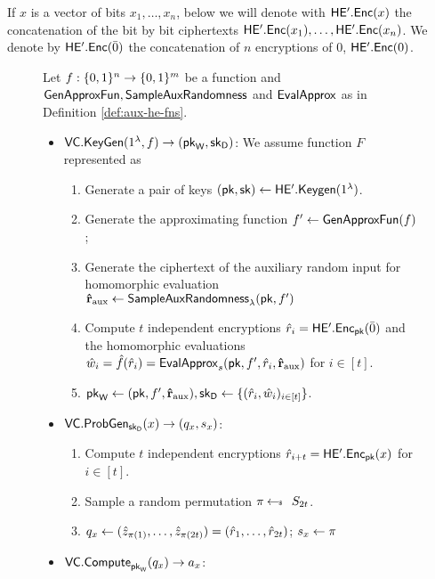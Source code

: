 If $x$ is a vector of bits $x_1, \dots, x_n$, below we will denote with $\mathsf{HE'.Enc}(x)$ the concatenation of the bit by bit ciphertexts $\mathsf{HE'.Enc}(x_1), \dots, \mathsf{HE'.Enc}(x_n)$. We denote by $\mathsf{HE'.Enc}(\bar{0})$ the concatenation of $n$ encryptions of $0$, $\mathsf{HE'.Enc}(0)$.


\begin{figure}
\begin{framed}
Let $f: \{0, 1\}^n \to \{0, 1\}^m$ be a function and $\mathsf{GenApproxFun}, \mathsf{SampleAuxRandomness}$ and $\mathsf{EvalApprox}$ as in Definition \ref{def:aux-he-fns}.
\begin{itemize}
\item $\mathsf{VC.KeyGen}(1^\lambda, f) \rightarrow (\mathsf{pk}_{\mathsf{W}}, \mathsf{sk}_{\mathsf{D}})$: We assume function $F$ represented as 
\begin{enumerate}
\item Generate a pair of keys $(\mathsf{pk},\mathsf{sk}) \gets \mathsf{HE'.Keygen}(1^\lambda)$.
\item Generate the approximating function $f' \gets \mathsf{GenApproxFun}(f)$;
\item Generate the ciphertext of the auxiliary random input for homomorphic evaluation $\mathbf{\hat{r}}_{\text{aux}} \gets \mathsf{SampleAuxRandomness}_{\lambda}(\mathsf{pk}, f')$
\item Compute $t$ independent encryptions $\hat{r}_i = \mathsf{HE'.Enc}_{\mathsf{pk}}(\bar{0})$ and the homomorphic evaluations $\hat{w}_i = \hat{f}(\hat{r}_i) =  \mathsf{EvalApprox}_s(\mathsf{pk}, f', \hat{r}_i, \mathbf{\hat{r}}_{\text{aux}})$ for $i \in [t]$. 
\item $\mathsf{pk}_{\mathsf{W}} \gets (\mathsf{pk}, f', \mathbf{\hat{r}}_{\text{aux}}), \mathsf{sk}_{\mathsf{D}} \gets \{ (\hat{r}_i, \hat{w}_i)_{i \in [t]}\}$.
\end{enumerate}
\item $\mathsf{VC.ProbGen}_{\mathsf{sk}_{\mathsf{D}}}(x) \rightarrow (q_x, s_x)$: 
\begin{enumerate}
\item Compute $t$ independent encryptions $\hat{r}_{i+t} = \mathsf{HE'.Enc}_{\mathsf{pk}}(x)$ for $i \in [t]$.
\item Sample a random permutation $\pi \sample S_{2t}$.
\item $q_x \gets (\hat{z}_{\pi(1)},\dots,\hat{z}_{\pi(2t)}) = (\hat{r}_1,\dots,\hat{r}_{2t})$; $s_x \gets \pi$
\end{enumerate}
\item $\mathsf{VC.Compute}_{\mathsf{pk}_{\mathsf{W}}}(q_x) \rightarrow a_x$:

\end{itemize}
\end{framed}
\end{figure}
